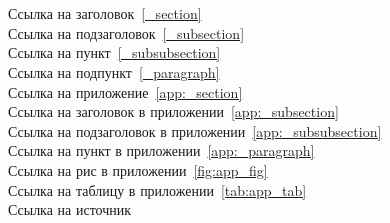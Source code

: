 \section{}

\noindent
Ссылка на заголовок~\ref{_section}\\
Ссылка на подзаголовок~\ref{_subsection}\\
Ссылка на пункт~\ref{_subsubsection}\\
Ссылка на подпункт~\ref{_paragraph}\\

\noindent
Ссылка на приложение~\ref{app:_section}\\
Ссылка на заголовок в приложении~\ref{app:_subsection}\\
Ссылка на подзаголовок в приложении~\ref{app:_subsubsection}\\
Ссылка на пункт в приложении~\ref{app:_paragraph}
\vspace{0.5em}\\
Ссылка на рис в приложении~\ref{fig:app_fig}\\
Ссылка на таблицу в приложении~\ref{tab:app_tab}\\

Ссылка на источник~\cite{wikibooks}

